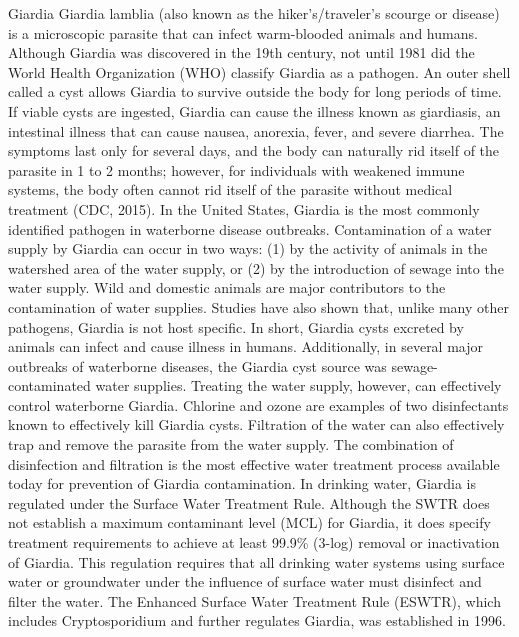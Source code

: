 \documentclass{article}
\begin{document}
Giardia Giardia lamblia (also known as the hiker's/traveler's scourge or
disease) is a microscopic parasite that can infect warm-blooded animals
and humans. Although Giardia was discovered in the 19th century, not
until 1981 did the World Health Organization (WHO) classify Giardia as a
pathogen. An outer shell called a cyst allows Giardia to survive outside
the body for long periods of time. If viable cysts are ingested, Giardia
can cause the illness known as giardiasis, an intestinal illness that
can cause nausea, anorexia, fever, and severe diarrhea. The symptoms
last only for several days, and the body can naturally rid itself of the
parasite in 1 to 2 months; however, for individuals with weakened immune
systems, the body often cannot rid itself of the parasite without
medical treatment (CDC, 2015). In the United States, Giardia is the most
commonly identified pathogen in waterborne disease outbreaks.
Contamination of a water supply by Giardia can occur in two ways: (1) by
the activity of animals in the watershed area of the water supply, or
(2) by the introduction of sewage into the water supply. Wild and
domestic animals are major contributors to the contamination of water
supplies. Studies have also shown that, unlike many other pathogens,
Giardia is not host specific. In short, Giardia cysts excreted by
animals can infect and cause illness in humans. Additionally, in several
major outbreaks of waterborne diseases, the Giardia cyst source was
sewage-contaminated water supplies. Treating the water supply, however,
can effectively control waterborne Giardia. Chlorine and ozone are
examples of two disinfectants known to effectively kill Giardia cysts.
Filtration of the water can also effectively trap and remove the
parasite from the water supply. The combination of disinfection and
filtration is the most effective water treatment process available today
for prevention of Giardia contamination. In drinking water, Giardia is
regulated under the Surface Water Treatment Rule. Although the SWTR does
not establish a maximum contaminant level (MCL) for Giardia, it does
specify treatment requirements to achieve at least 99.9\% (3-log)
removal or inactivation of Giardia. This regulation requires that all
drinking water systems using surface water or groundwater under the
influence of surface water must disinfect and filter the water. The
Enhanced Surface Water Treatment Rule (ESWTR), which includes
Cryptosporidium and further regulates Giardia, was established in 1996.
\end{document}
